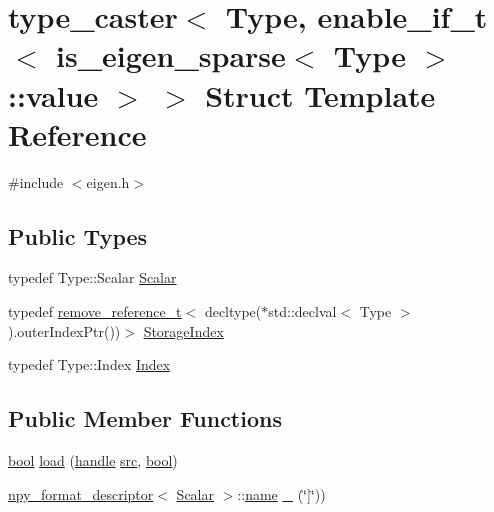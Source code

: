\hypertarget{structtype__caster_3_01_type_00_01enable__if__t_3_01is__eigen__sparse_3_01_type_01_4_1_1value_01_4_01_4}{}\section{type\+\_\+caster$<$ Type, enable\+\_\+if\+\_\+t$<$ is\+\_\+eigen\+\_\+sparse$<$ Type $>$\+::value $>$ $>$ Struct Template Reference}
\label{structtype__caster_3_01_type_00_01enable__if__t_3_01is__eigen__sparse_3_01_type_01_4_1_1value_01_4_01_4}


{\ttfamily \#include $<$eigen.\+h$>$}

\subsection*{Public Types}
\begin{DoxyCompactItemize}
\item 
typedef Type\+::\+Scalar \mbox{\hyperlink{structtype__caster_3_01_type_00_01enable__if__t_3_01is__eigen__sparse_3_01_type_01_4_1_1value_01_4_01_4_a5136dbf552bfcb9ca707f5ed51fed848}{Scalar}}
\item 
typedef \mbox{\hyperlink{detail_2common_8h_a3a08cea569e6926ac8d7d74dd7178b5f}{remove\+\_\+reference\+\_\+t}}$<$ decltype($\ast$std\+::declval$<$ Type $>$).outer\+Index\+Ptr())$>$ \mbox{\hyperlink{structtype__caster_3_01_type_00_01enable__if__t_3_01is__eigen__sparse_3_01_type_01_4_1_1value_01_4_01_4_ab39275266506bb00041626baa4b70653}{Storage\+Index}}
\item 
typedef Type\+::\+Index \mbox{\hyperlink{structtype__caster_3_01_type_00_01enable__if__t_3_01is__eigen__sparse_3_01_type_01_4_1_1value_01_4_01_4_a9ce3b790dd5bdeb5578419053e450feb}{Index}}
\end{DoxyCompactItemize}
\subsection*{Public Member Functions}
\begin{DoxyCompactItemize}
\item 
\mbox{\hyperlink{asdl_8h_af6a258d8f3ee5206d682d799316314b1}{bool}} \mbox{\hyperlink{structtype__caster_3_01_type_00_01enable__if__t_3_01is__eigen__sparse_3_01_type_01_4_1_1value_01_4_01_4_afd4f3130a50768064872d4c9e57b0fdd}{load}} (\mbox{\hyperlink{classhandle}{handle}} \mbox{\hyperlink{_s_d_l__opengl__glext_8h_a72e0fdf0f845ded60b1fada9e9195cd7}{src}}, \mbox{\hyperlink{asdl_8h_af6a258d8f3ee5206d682d799316314b1}{bool}})
\item 
\mbox{\hyperlink{structnpy__format__descriptor}{npy\+\_\+format\+\_\+descriptor}}$<$ \mbox{\hyperlink{structtype__caster_3_01_type_00_01enable__if__t_3_01is__eigen__sparse_3_01_type_01_4_1_1value_01_4_01_4_a5136dbf552bfcb9ca707f5ed51fed848}{Scalar}} $>$\+::\mbox{\hyperlink{structname}{name}} \mbox{\hyperlink{structtype__caster_3_01_type_00_01enable__if__t_3_01is__eigen__sparse_3_01_type_01_4_1_1value_01_4_01_4_aa3b5aaf90f33e87012c04e52cb29b6d6}{\+\_\+}} (\char`\"{}\mbox{]}\char`\"{}))
\end{DoxyCompactItemize}
